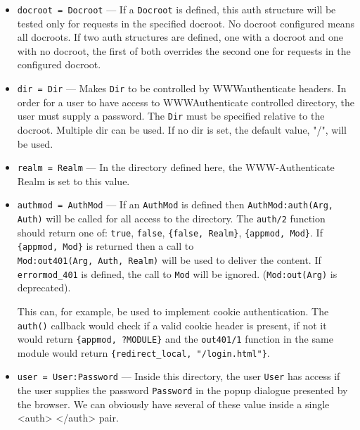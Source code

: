 \documentclass[11pt,oneside,english]{book}
\begin{document}
\begin{itemize}
              \begin{itemize}
              \item \verb+docroot = Docroot+ --- If a \verb+Docroot+ is defined,
                this auth structure will be tested only for requests in the
                specified docroot. No docroot configured means all docroots.  If
                two auth structures are defined, one with a docroot and one with
                no docroot, the first of both overrides the second one for
                requests in the configured docroot.

              \item \verb+dir = Dir+ --- Makes \verb+Dir+ to be controlled by
                WWW\-authenticate headers. In order for a user to have access to
                WWW\-Authenticate controlled directory, the user must supply a
                password. The \verb+Dir+ must be specified relative to the
                docroot. Multiple dir can be used. If no dir is set, the default
                value, "/", will be used.

              \item \verb+realm = Realm+ --- In the directory defined here, the
                WWW-Authenticate Realm is set to this value.

              \item \verb+authmod = AuthMod+ --- If an \verb+AuthMod+ is defined
                then \verb+AuthMod:auth(Arg, Auth)+ will be called for all
                access to the directory. The \verb+auth/2+ function should
                return one of: \verb+true+, \verb+false+, \verb+{false, Realm}+,
                \verb+{appmod, Mod}+. If \verb+{appmod, Mod}+ is returned then a
                call to\\ \verb+Mod:out401(Arg, Auth, Realm)+ will be used to
                deliver the content. If \verb+errormod_401+ is defined, the call
                to \verb+Mod+ will be ignored. (\verb+Mod:out(Arg)+ is
                deprecated).

                This can, for example, be used to implement cookie
                authentication. The \verb+auth()+ callback would check if a
                valid cookie header is present, if not it would return
                \verb+{appmod, ?MODULE}+ and the \verb+out401/1+ function in the
                same module would return \verb+{redirect_local, "/login.html"}+.

              \item \verb+user = User:Password+ --- Inside this directory, the
                user \verb+User+ has access if the user supplies the password
                \verb+Password+ in the popup dialogue presented by the browser.
                We can obviously have several of these value inside a single
                <auth> </auth> pair.


\end{itemize}
\end{itemize}
\end{document}
